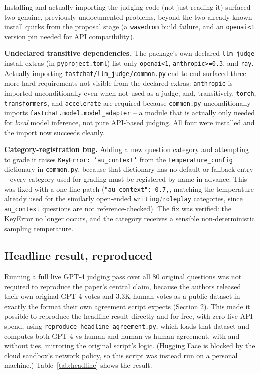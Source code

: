 \documentclass[11pt,twocolumn]{article}
\begin{document}
Installing and actually importing the judging code (not just reading it) surfaced two genuine,
previously undocumented problems, beyond the two already-known install quirks from the proposal
stage (a \texttt{wavedrom} build failure, and an \texttt{openai<1} version pin needed for API
compatibility).

\textbf{Undeclared transitive dependencies.} The package's own declared \texttt{llm\_judge} install
extras (in \texttt{pyproject.toml}) list only \texttt{openai<1}, \texttt{anthropic>=0.3}, and
\texttt{ray}. Actually importing \texttt{fastchat/llm\_judge/common.py} end-to-end surfaced three
more hard requirements not visible from the declared extras: \texttt{anthropic} is imported
unconditionally even when not used as a judge, and, transitively, \texttt{torch},
\texttt{transformers}, and \texttt{accelerate} are required because \texttt{common.py}
unconditionally imports \texttt{fastchat.model.model\_adapter} -- a module that is actually only
needed for \emph{local} model inference, not pure API-based judging. All four were installed and
the import now succeeds cleanly.

\textbf{Category-registration bug.} Adding a new question category and attempting to grade it
raises \texttt{KeyError: 'au\_context'} from the \texttt{temperature\_config} dictionary in
\texttt{common.py}, because that dictionary has no default or fallback entry -- every category used
for grading must be registered by name in advance. This was fixed with a one-line patch
(\texttt{"au\_context": 0.7,}, matching the temperature already used for the similarly open-ended
\texttt{writing}/\texttt{roleplay} categories, since \texttt{au\_context} questions are not
reference-checked). The fix was verified: the KeyError no longer occurs, and the category receives
a sensible non-deterministic sampling temperature.

\subsection{Headline result, reproduced}

Running a full live GPT-4 judging pass over all 80 original questions was not required to
reproduce the paper's central claim, because the authors released their own original GPT-4 votes
and 3.3K human votes as a public dataset in exactly the format their own agreement script expects
(Section 2). This made it possible to reproduce the headline result directly and for free, with
zero live API spend, using \texttt{reproduce\_headline\_agreement.py}, which loads that dataset and
computes both GPT-4-vs-human and human-vs-human agreement, with and without ties, mirroring the
original script's logic. (Hugging Face is blocked by the cloud sandbox's network policy, so this
script was instead run on a personal machine.) Table~\ref{tab:headline} shows the result.
\end{document}
